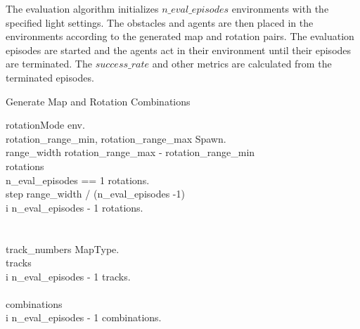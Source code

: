 The evaluation algorithm initializes $n\_eval\_episodes$ environments with the specified light settings. The obstacles and agents are then placed in the environments according to the generated map and rotation pairs. The evaluation episodes are started and the agents act in their environment until their episodes are terminated. The $success\_rate$ and other metrics are calculated from the terminated episodes.


\renewcommand{\thepseudonum}{\roman{pseudonum}}
\begin{pseudocode}{Generate Map and Rotation Combinations}{ }


rotationMode \GETS env.\\
rotation\_range\_min, rotation\_range\_max \GETS Spawn.\\

range\_width \GETS rotation\_range\_max - rotation\_range\_min\\
rotations \GETS []\\

\IF n\_eval\_episodes == 1 \THEN
    rotations.\\
\ELSE
\BEGIN
    step \GETS range\_width / (n\_eval\_episodes -1)\\
    \FOR i  \TO n\_eval\_episodes - 1 \DO
        \BEGIN
        rotations.\\
        \END\\
\END\\

track\_numbers \GETS MapType.\\
tracks \GETS []\\
\FOR i  \TO n\_eval\_episodes - 1 \DO
\BEGIN
tracks.\\
\END\\

combinations \GETS []\\
\FOR i  \TO n\_eval\_episodes - 1 \DO
\BEGIN
combinations.\\
\END\\

\ENDPROCEDURE
\label{fig:generate_track_rotation}
\end{pseudocode}


